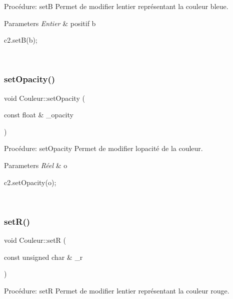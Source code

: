 Procédure\+: setB Permet de modifier l\textquotesingle{}entier représentant la couleur bleue. 


\begin{DoxyParams}{Parameters}
{\em Entier} & positif b 
\begin{DoxyCode}
c2.setB(b);
\end{DoxyCode}
 \\
\hline
\end{DoxyParams}
\mbox{\label{classCouleur_a54817aff2a5f8d5dfcf6358d523c923a}} 
\subsubsection{\texorpdfstring{set\+Opacity()}{setOpacity()}}
{\footnotesize\ttfamily void Couleur\+::set\+Opacity (\begin{DoxyParamCaption}\item[{const float \&}]{\+\_\+opacity }\end{DoxyParamCaption})}



Procédure\+: set\+Opacity Permet de modifier l\textquotesingle{}opacité de la couleur. 


\begin{DoxyParams}{Parameters}
{\em Réel} & o 
\begin{DoxyCode}
c2.setOpacity(o);
\end{DoxyCode}
 \\
\hline
\end{DoxyParams}
\mbox{\label{classCouleur_aeb7507061466c7c1e18d3b870f876ac0}} 
\subsubsection{\texorpdfstring{set\+R()}{setR()}}
{\footnotesize\ttfamily void Couleur\+::setR (\begin{DoxyParamCaption}\item[{const unsigned char \&}]{\+\_\+r }\end{DoxyParamCaption})}



Procédure\+: setR Permet de modifier l\textquotesingle{}entier représentant la couleur rouge. 


